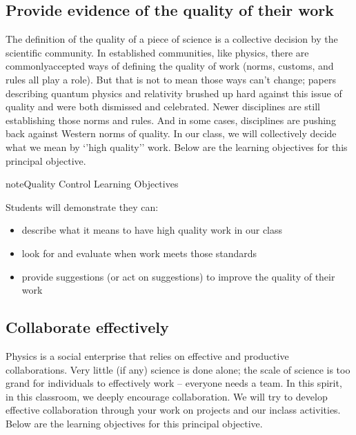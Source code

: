 \documentclass[letterpaper,10pt,english]{jupyterBook}
\begin{document}
\subsection{Provide evidence of the quality of their work}
\label{\detokenize{content/0_course/1_goals:provide-evidence-of-the-quality-of-their-work}}
\sphinxAtStartPar
The definition of the quality of a piece of science is a collective decision by the scientific community. In established communities, like physics, there are commonly\sphinxhyphen{}accepted ways of defining the quality of work (norms, customs, and rules all play a role). But that is not to mean those ways can’t change; papers describing quantum physics and relativity brushed up hard against this issue of quality and were both dismissed and celebrated. Newer disciplines are still establishing those norms and rules. And in some cases, disciplines are pushing back against Western norms of quality. In our class, we will collectively decide what we mean by ‘’high quality’’ work. Below are the learning objectives for this principal objective.

\begin{sphinxadmonition}{note}{Quality Control Learning Objectives}

\sphinxAtStartPar
Students will demonstrate they can:
\begin{itemize}
\item {} 
\sphinxAtStartPar
describe what it means to have high quality work in our class

\item {} 
\sphinxAtStartPar
look for and evaluate when work meets those standards

\item {} 
\sphinxAtStartPar
provide suggestions (or act on suggestions) to improve the quality of their work

\end{itemize}
\end{sphinxadmonition}


\subsection{Collaborate effectively}
\label{\detokenize{content/0_course/1_goals:collaborate-effectively}}
\sphinxAtStartPar
Physics is a social enterprise that relies on effective and productive collaborations. Very little (if any) science is done alone; the scale of science is too grand for individuals to effectively work – everyone needs a team. In this spirit, in this classroom, we deeply encourage collaboration. We will try to develop effective collaboration through your work on projects and our in\sphinxhyphen{}class activities. Below are the learning objectives for this principal objective.
\end{document}
